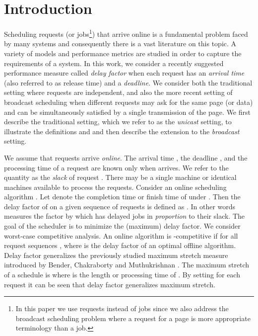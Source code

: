 \documentclass[11pt]{article}
\begin{document}
\section{Introduction}
Scheduling requests (or jobs\footnote{In this paper we use requests
  instead of jobs since we also address the broadcast scheduling
  problem where a request for a page is more appropriate terminology
  than a job.}) that arrive online is a fundamental problem faced by
many systems and consequently there is a vast literature on this
topic. A variety of models and performance metrics are studied in
order to capture the requirements of a system. In this work, we
consider a recently suggested performance measure called {\em delay
  factor} \cite{ChangEGK08} when each request has an {\em arrival
  time} (also referred to as release time) and a {\em deadline}. We
consider both the traditional setting where requests are independent,
and also the more recent setting of broadcast scheduling when
different requests may ask for the same page (or data) and can be
simultaneously satisfied by a single transmission of the page. We
first describe the traditional setting, which we refer to as the {\em
  unicast} setting, to illustrate the definitions and and then
describe the extension to the {\em broadcast} setting.

We assume that requests arrive {\em online}. The arrival time ,
the deadline , and the processing time  of a request
 are known only when  arrives. We refer to the quantity  as the {\em slack} of request . There may be a single
machine or  identical machines available to process the
requests. Consider an online scheduling algorithm . Let 
denote the completion time or finish time of  under . Then the
delay factor of  on a given sequence of requests  is
defined as . In other words  measures the
factor by which  has delayed jobs in {\em proportion} to their
slack. The goal of the
scheduler is to minimize the (maximum) delay factor. We consider
worst-case competitive analysis. An online algorithm  is
-competitive if for all request sequences ,
 where  is
the delay factor of an optimal offline algorithm.  Delay factor
generalizes the previously studied maximum stretch measure introduced
by Bender, Chakraborty and Muthukrishnan \cite{BenderCM98}. The
maximum stretch of a schedule  is  where  is the length or processing time of
. By setting  for each request  it can be
seen that delay factor generalizes maximum stretch.
\end{document}
